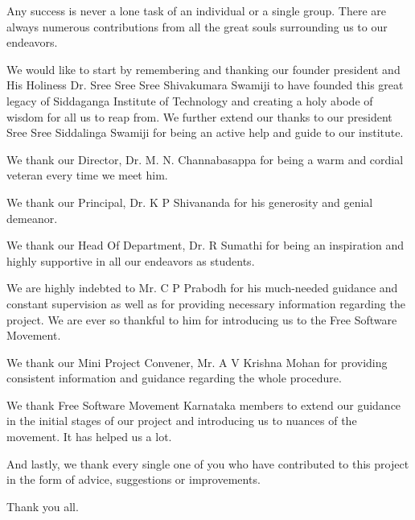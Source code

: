 \begin{acknowledgementslong}


Any success is never a lone task of an individual or a single group. There are always numerous contributions from all the great souls surrounding us to our endeavors.

We would like to start by remembering and thanking our founder president and His Holiness Dr. Sree Sree Sree Shivakumara Swamiji to have founded this great legacy of Siddaganga Institute of Technology and creating a holy abode of wisdom for all us to reap from. We further extend our thanks to our president Sree Sree Siddalinga Swamiji for being an active help and guide to our institute.

We thank our Director, Dr. M. N. Channabasappa for being a warm and cordial veteran every time we meet him. 

We thank our Principal, Dr. K P Shivananda for his generosity and genial demeanor.

We thank our Head Of Department, Dr. R Sumathi for being an inspiration and highly supportive in all our endeavors as students.

We are highly indebted to Mr. C P Prabodh for his much-needed guidance and constant supervision as well as for providing necessary information regarding the project. We are ever so thankful to him for introducing us to the Free Software Movement.

We thank our Mini Project Convener, Mr. A V Krishna Mohan for providing consistent information and guidance regarding the whole procedure. 


We thank Free Software Movement Karnataka\cite{FSMK} members to extend our guidance in the initial stages of our project and introducing us to nuances of the movement. It has helped us a lot.

And lastly, we thank every single one of you who have contributed to this project in the form of advice, suggestions or improvements.

Thank you all.

\end{acknowledgementslong}

